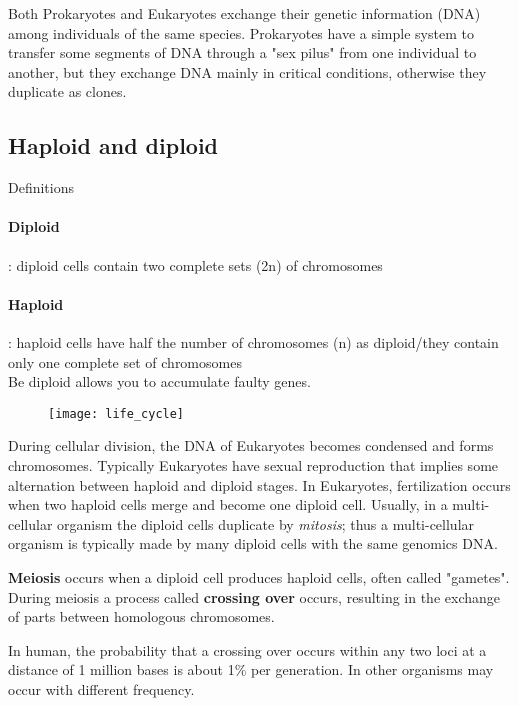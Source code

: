 Both Prokaryotes and Eukaryotes exchange their genetic information (DNA)
among individuals of the same species. Prokaryotes have a simple system to
transfer some segments of DNA through a "sex pilus" from one individual to
another, but they exchange DNA mainly in critical conditions, otherwise they
duplicate as clones.

\subsection{Haploid and diploid}

Definitions

\paragraph*{Diploid}: diploid cells contain two complete sets (2n) of
chromosomes

\paragraph*{Haploid}: haploid cells have half the number of chromosomes (n) as
diploid/they contain only one complete set of chromosomes \\


Be diploid allows you to accumulate faulty genes.

\begin{figure}[H]
  \centering
  \texttt{[image: life\_cycle]}
\end{figure}

During cellular division, the DNA of Eukaryotes becomes condensed and forms
chromosomes. Typically Eukaryotes have sexual reproduction that implies some
alternation between haploid and diploid stages. In Eukaryotes, fertilization
occurs when two haploid cells merge and become one diploid cell. Usually, in a
multi-cellular organism the diploid cells duplicate by \textit{mitosis}; thus a
multi-cellular organism is typically made by many diploid cells with the same
genomics DNA.

\textbf{Meiosis} occurs when a diploid cell produces haploid cells, often
called "gametes". During meiosis a process called \textbf{crossing over} occurs,
resulting in the exchange of parts between homologous chromosomes.

In human, the probability that a crossing over occurs within any two loci at
a distance of 1 million bases is about 1\% per generation.
In other organisms may occur with different frequency.

